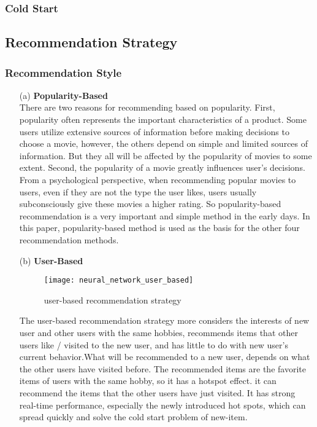 \subsubsection{Cold Start}

\subsection{Recommendation Strategy}
\subsubsection{Recommendation Style}
\begin{itemize}

\item[(a)]\textbf{Popularity-Based}\\
There are two reasons for recommending based on popularity. First, popularity often represents the important characteristics of a product. Some users utilize extensive sources of information before making decisions to choose a movie, however, the others depend on simple and limited sources of information. But they all will be affected by the popularity of movies to some extent. Second, the popularity of a movie greatly influences user's decisions. From a psychological perspective, when recommending popular movies to users, even if they are not the type the user likes, users usually subconsciously give these movies a higher rating\cite{ahn2006utilizing}. So popularity-based recommendation is a very important and simple method in the early days. In this paper, popularity-based method is used as the basis for the other four recommendation methods.
\item[(b)]\textbf{User-Based}\\
\begin{figure}[h]
\caption{user-based recommendation strategy}
\centering
\texttt{[image: neural\_network\_user\_based]}
\end{figure}
The user-based recommendation strategy more considers the interests of new user and other users with the same hobbies, recommends items that other users like / visited to the new user, and has little to do with new user's current behavior.What will be recommended to a new user, depends on what the other users have visited before. The recommended items are the favorite items of users with the same hobby, so it has a hotspot effect. it can recommend the items that the other users have just visited. It has strong real-time performance, especially the newly introduced hot spots, which can spread quickly and solve the cold start problem of new-item.

\end{itemize}
